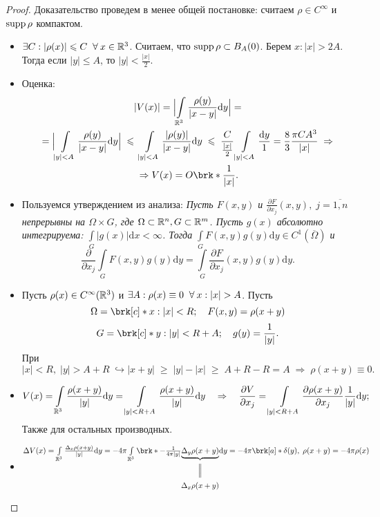 \begin{proof}

Доказательство проведем в менее общей постановке: считаем $\rho \in C^\infty$ и $\operatorname{supp}{\rho}$ компактом.

	\begin{itemize}
		\item $\exists C: |\rho (x)|\leqslant C \;\;\forall\:  x \in \mathbb{R}^3$. Считаем, что $\operatorname{supp}{\rho}  \subset B_A(0)$. Берем $x: |x| > 2A$. Тогда если $|y| \leq A$, то $|y| < \frac{|x|}{2}$.
        \item Оценка:
        	\begin{multline*}
				\ |V (x)| = \Bigl | \int\limits_{\R^3} \frac{\rho (y)}{|x-y|}\mathrm{d}y \Bigr | = {}\\
                {} = \Bigl | \int\limits_{|y|<A} \frac{\rho (y)}{|x-y|}\mathrm{d}y \Bigr | \;\leq\; \int\limits_{|y|<A} \frac{|\rho (y)|}{|x-y|}\mathrm{d}y \;\leq\; \frac{C}{\frac{|x|}{2}}\int\limits_{|y|<A}\frac{\mathrm{d}y}{1} = \frac{8}{3}\frac{\pi C A^3}{|x|} \;\Rightarrow {}\\
                {} \Rightarrow V (x) = O \brk*{\frac{1}{|x|}}.
			\end{multline*}
        \item Пользуемся утверждением из анализа: {\it Пусть $F(x,y)$ и $\frac{\partial F}{\partial x_j}(x,y), \; j= \overline{1,n}$ непрерывны на $\Omega \times G$, где $\Omega \subset  \mathbb{R}^n, G \subset \mathbb{R}^m$. Пусть $g(x)$ абсолютно интегрируема: $\int\limits_G |g(x)| \mathrm{d}x < \infty$. Тогда $\int\limits_G F(x,y)g(y) \mathrm{d}y \in C^1(\overline{\Omega})$ и
        $$
        \frac{\partial}{\partial x_j}\int\limits_G F(x,y)g(y)\mathrm{d}y = \int\limits_G \frac{\partial F}{\partial x_j}(x,y)g(y)\mathrm{d}y. 
        $$}
        \item Пусть $\rho (x) \in C^\infty (\mathbb{R}^3)$ и $\exists A: \rho (x) \equiv 0 \;\;\forall\: x: |x| > A$. Пусть 
        $$\Omega = \brk[c]*{x: |x| < R};\quad F(x,y) = \rho (x+y)$$
        $$G = \brk[c]*{y: |y| < R+A};\quad g(y) = \frac{1}{|y|}.$$
        При $|x| < R,\; |y| > A+R \; \hookrightarrow |x+y| \;\geq\; |y| - |x| \;\geq\; A+R -R = A \;\Rightarrow \; \rho (x+y) \equiv 0. $
        \item 
        $$
        V (x) = \int\limits_{\mathbb{R}^3}\frac{\rho (x+y)}{|y|}\mathrm{d} y = \int\limits_{|y| < R+A}\frac{\rho (x+y)}{|y|}\mathrm{d} y \quad \Rightarrow\quad \frac{\partial V}{\partial x_j} = \int\limits_{|y| < R+A}\frac{\partial \rho (x+y)}{\partial x_j}\frac{1}{|y|}\mathrm{d} y
        ;$$ Также для остальных производных.
        \item 
        $$
        \begin{CD}
          \Delta V (x) = \int\limits_{\R^3}\frac{\Delta_x \rho (x+y)}{|y|}\mathrm{d}y = -4\pi \int\limits_{\R^3}\brk*{-\frac{1}{4\pi |y|}} @. \underbrace{\Delta_y \rho (x+y)} @.\mathrm{d}y = -4\pi \brk[a]*{\delta(y),\; \rho (x+y)} = -4\pi \rho (x) \\
          @.   @|   @.\\
          @.   {\Delta_x \rho (x+y)}   @.
        \end{CD}
        $$
	\end{itemize}

\end{proof}